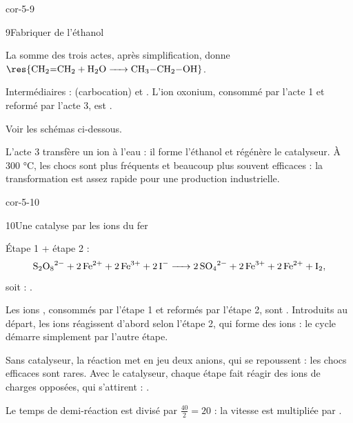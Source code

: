 \begin{blocLivre}{cor-5-9}
\begin{corrige}{9}{Fabriquer de l'éthanol}
\begin{questions}
\item La somme des trois actes, après simplification, donne $\res{\ce{CH2=CH2 + H2O -> CH3-CH2-OH}}$.
\item Intermédiaires :  (carbocation) et . L'ion oxonium, consommé par
l'acte 1 et reformé par l'acte 3, est .
\item Voir les schémas ci-dessous.
\item L'acte 3 transfère un ion  à l'eau : il forme l'éthanol et régénère le catalyseur. À 300 °C, les chocs
sont plus fréquents et beaucoup plus souvent efficaces : la transformation est assez rapide pour une production industrielle.
\end{questions}
\end{corrige}
\end{blocLivre}
\begin{blocLivre}{cor-5-10}
\begin{corrige}{10}{Une catalyse par les ions du fer}
\begin{questions}
\item Étape 1 + étape 2 :
\[\ce{S2O8^2- + 2 Fe^2+ + 2 Fe^3+ + 2 I- -> 2 SO4^2- + 2 Fe^3+ + 2 Fe^2+ + I2},\]
soit  : .
\item Les ions , consommés par l'étape 1 et reformés par l'étape 2, sont . Introduits
au départ, les ions  réagissent d'abord selon l'étape 2, qui forme des ions  : le cycle démarre
simplement par l'autre étape.
\item Sans catalyseur, la réaction met en jeu deux anions, qui se repoussent : les chocs efficaces sont rares. Avec le
catalyseur, chaque étape fait réagir des ions de charges opposées, qui s'attirent : .
\item Le temps de demi-réaction est divisé par $\frac{40}{2}=20$ : la vitesse est multipliée par .
\end{questions}
\end{corrige}
\end{blocLivre}
